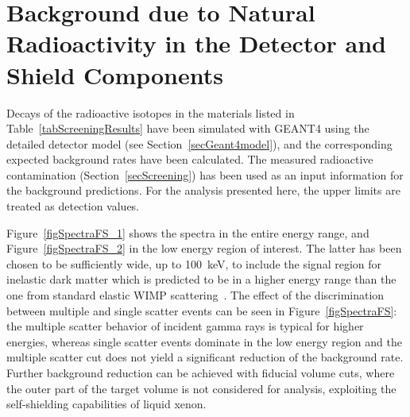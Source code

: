 \section{Background due to Natural Radioactivity in the Detector and Shield Components}
\label{secDetectorMaterials}

Decays of the radioactive isotopes in the materials listed in Table~\ref{tabScreeningResults} have been simulated with GEANT4 using the detailed detector model (see Section~\ref{secGeant4model}), and the corresponding expected background rates have been calculated. The measured radioactive contamination (Section~\ref{secScreening}) has been used as an input information for the background predictions. For the analysis presented here, the upper limits are treated as detection values.

Figure~\ref{figSpectraFS_1} shows the spectra in the entire energy range, and Figure~\ref{figSpectraFS_2} in the low energy region of interest. The latter has been chosen to be sufficiently wide, up to 100~keV, to include the signal region for inelastic dark matter which is predicted to be in a higher energy range than the one from standard elastic WIMP scattering~\cite{inelasticDM1, inelasticDM2}.  The effect of the discrimination between multiple and single scatter events can be seen in Figure~\ref{figSpectraFS}: the multiple scatter behavior of incident gamma rays is typical for higher energies, whereas single scatter events dominate in the low energy region and the multiple scatter cut does not yield a significant reduction of the background rate. Further background reduction can be achieved with fiducial volume cuts, where the outer part of the  target volume is not considered for analysis, exploiting the self-shielding capabilities of liquid xenon.

